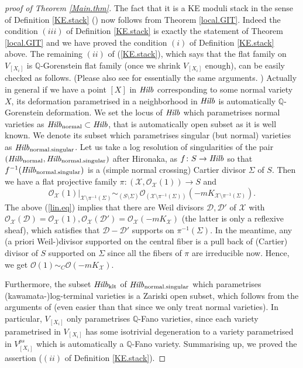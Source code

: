 \documentclass[12pt]{amsart}
\theoremstyle{remark}
\theoremstyle{definition}
\begin{document}
\begin{proof}[proof of Theorem \ref{Main.thm}]
The fact that it is a KE moduli stack in the sense of Definition \ref{KE.stack}
(\cite{OSS}) now follows from Theorem \ref{local.GIT}. Indeed the condition $(iii)$ 
of Definition \ref{KE.stack} is exactly the statement of Theorem \ref{local.GIT} 
and we have proved the condition $(i)$ of Definition \ref{KE.stack} above. The 
remaining $(ii)$ of (\ref{KE.stack}), which says that the 
flat family on $V_{[X_{i}]}$ is $\mathbb{Q}$-Gorenstein flat family (once we 
shrink $V_{[X_{i}]}$ enough), can be easily checked as follows. 
(Please also see \cite[(2.4)]{OSS} for essentially the same arguments. )
Actually in general if we have a point $[X]$ in ${\it Hilb}$ 
corresponding to some normal variety $X$, its deformation parametrised in a 
neighborhood in ${\it Hilb}$ is automatically $\mathbb{Q}$-Gorenstein deformation. 
We set the locus of ${\it Hilb}$ which parametrises normal varieties as 
${\it Hilb}_{\text{normal}}\subset {\it Hilb}$, that is automatically open subset as
it is well known. We denote its subset which parametrises singular (but normal) 
varieties as ${\it Hilb}_{\text{normal.singular}}$. 
Let us take a log resolution of singularities of the pair 
$({\it Hilb}_{\text{normal}},{\it Hilb}_{\text{normal.singular}})$ after Hironaka, 
as 
$f\colon S\to {\it Hilb}$ so that $f^{-1}({\it Hilb}_{\text{normal.singular}})$ is 
a (simple normal crossing) Cartier divisor $\Sigma$ of $S$. Then 
we have a flat projective family 
$\pi\colon (\mathcal{X},\mathcal{O}_{\mathcal{X}}(1))\rightarrow S$ and 
\begin{equation}\label{lin.eq}
\mathcal{O}_{\mathcal{X}}(1)|_{\mathcal{X}\setminus \pi^{-1}(\Sigma)}
\sim_{(S\setminus \Sigma)} \mathcal{O}_{(\mathcal{X}\setminus \pi^{-1}(\Sigma))}(-mK_{\mathcal{X}\setminus \pi^{-1}(\Sigma)}). 
\end{equation}
The above (\ref{lin.eq}) 
implies that there are Weil divisors $\mathcal{D}, \mathcal{D}'$ of $\mathcal{X}$ with 
$\mathcal{O}_{\mathcal{X}}(\mathcal{D})=\mathcal{O}_{\mathcal{X}}(1), \mathcal{O}_{\mathcal{X}}(\mathcal{D}')=
\mathcal{O}_{\mathcal{X}}(-mK_{\mathcal{X}})$ (the latter is only a reflexive sheaf), 
which satisfies that $\mathcal{D}-\mathcal{D}'$ supports on $\pi^{-1}(\Sigma)$. 
In the meantime, any (a priori Weil-)divisor supported 
on the central fiber is a pull back of (Cartier) divisor of $S$ supported on 
$\Sigma$ since all the fibers of $\pi$ are irreducible now. Hence, we 
get $\mathcal{O}(1)\sim_{C}\mathcal{O}(-mK_{\mathcal{X}})$. 

Furthermore, the subset ${\it Hilb}_{\text{klt}}$ 
of ${\it Hilb}_{\text{normal.singular}}$ which parametrises 
(kawamata-)log-terminal varieties is a Zariski open subset, which follows from the 
arguments of \cite[Appendix A]{AH} 
(even easier than that since we only treat normal varieties). In particular, 
$V_{[X_{i}]}$ only parametrises $\mathbb{Q}$-Fano varieties, since each variety 
parametrised in $V_{[X_{i}]}$ has some isotrivial degeneration to a variety 
parametrised in $V_{[X_{i}]}^{ps}$ which is automatically a $\mathbb{Q}$-Fano 
variety. Summarising up, we proved the 
assertion ($(ii)$ of Definition \ref{KE.stack}). 


\end{proof}
\end{document}
